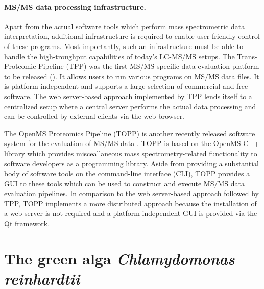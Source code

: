 \paragraph{MS/MS data processing infrastructure.}

Apart from the actual software tools which perform mass spectrometric data 
interpretation, additional infrastructure is required to enable user-friendly 
control of these programs.
Most importantly, such an infrastructure must be able to handle the 
high-troughput capabilities of today's LC-MS/MS setups.
The Trans-Proteomic Pipeline (TPP) was the first MS/MS-specific data evaluation 
platform to be released (\cite{Keller2005}).
It allows users to run various programs on MS/MS data files.
It is platform-independent and supports a large selection of commercial and
free software.
The web server-based approach implemented by TPP lends itself to a centralized
setup where a central server performs the actual data processing and can
be controlled by external clients via the web browser.

The OpenMS Proteomics Pipeline (TOPP) is another recently released software 
system for the evaluation of MS/MS data \citep{Kohlbacher2007}.
TOPP is based on the OpenMS C++ library which provides misceallaneous mass 
spectrometry-related functionality to software developers as a programming 
library.
Aside from providing a substantial body of software tools on the command-line 
interface (CLI), TOPP provides a GUI to these tools which can be used to
construct and execute MS/MS data evaluation pipelines.
In comparison to the web server-based approach followed by TPP, TOPP implements
a more distributed approach because the installation of a web server is not
required and a platform-independent GUI is provided via the Qt framework.

\section{The green alga {\em Chlamydomonas reinhardtii}}

